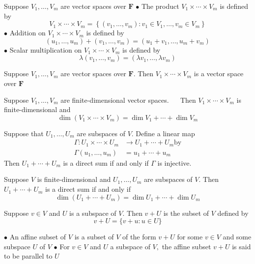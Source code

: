 
Suppose $V_{1}, \ldots, V_{m}$ are vector spaces over $\mathbf{F}$
$\bullet$ The product $V_{1} \times \cdots \times V_{m}$ is defined by
$$
V_{1} \times \cdots \times V_{m}=\left\{\left(v_{1}, \ldots, v_{m}\right): v_{1} \in V_{1}, \ldots, v_{m} \in V_{m}\right\}
$$
$\bullet$ Addition on $V_{1} \times \cdots \times V_{m}$ is defined by
$$
\left(u_{1}, \ldots, u_{m}\right)+\left(v_{1}, \ldots, v_{m}\right)=\left(u_{1}+v_{1}, \ldots, u_{m}+v_{m}\right)
$$
$\bullet$ Scalar multiplication on $V_{1} \times \cdots \times V_{m}$ is defined by
$$
\lambda\left(v_{1}, \ldots, v_{m}\right)=\left(\lambda v_{1}, \ldots, \lambda v_{m}\right)
$$

Suppose $V_{1}, \ldots, V_{m}$ are vector spaces over $\mathbf{F} .$ Then $V_{1} \times \cdots \times V_{m}$ is a vector space over $\mathbf{F}$

Suppose $V_{1}, \ldots, V_{m}$ are finite-dimensional vector spaces. $\quad$ Then $V_{1} \times \cdots \times V_{m}$ is finite-dimensional and
$$
\operatorname{dim}\left(V_{1} \times \cdots \times V_{m}\right)=\operatorname{dim} V_{1}+\cdots+\operatorname{dim} V_{m}
$$

Suppose that $U_{1}, \ldots, U_{m}$ are subspaces of $V .$ Define a linear map
$$
\begin{aligned}
\Gamma: U_{1} \times \cdots \times U_{m} & \rightarrow U_{1}+\cdots+U_{m} \mathrm{by} \\
\Gamma\left(u_{1}, \ldots, u_{m}\right) &=u_{1}+\cdots+u_{m}
\end{aligned}
$$
Then $U_{1}+\cdots+U_{m}$ is a direct sum if and only if $\Gamma$ is injective.

Suppose $V$ is finite-dimensional and $U_{1}, \ldots, U_{m}$ are subspaces of $V .$ Then $U_{1}+\cdots+U_{m}$ is a direct sum if and only if
$$
\operatorname{dim}\left(U_{1}+\cdots+U_{m}\right)=\operatorname{dim} U_{1}+\cdots+\operatorname{dim} U_{m}
$$

Suppose $v \in V$ and $U$ is a subspace of $V .$ Then $v+U$ is the subset of $V$ defined by
$$
v+U=\{v+u: u \in U\}
$$

$\bullet$ An affine subset of $V$ is a subset of $V$ of the form $v+U$ for some $v \in V$ and some subspace $U$ of $V$
$\bullet$ For $v \in V$ and $U$ a subspace of $V,$ the affine subset $v+U$ is said to be parallel to $U$